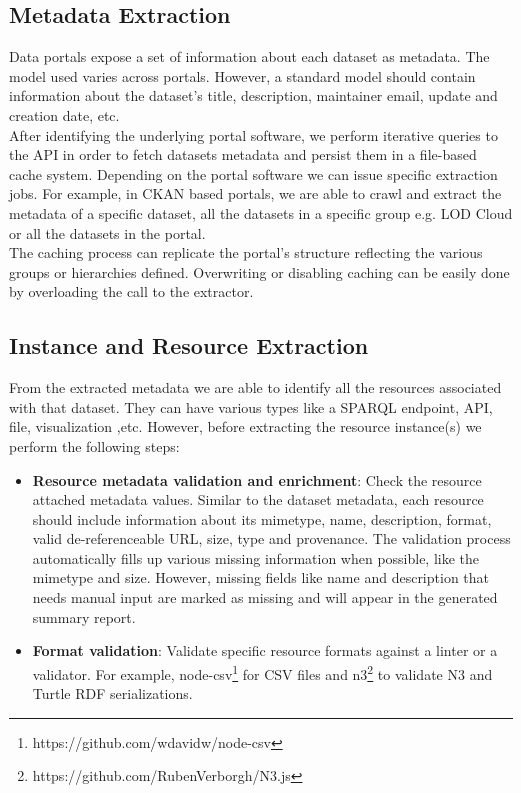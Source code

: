 \documentclass[runningheads,a4paper]{llncs}
\begin{document}
\subsection{Metadata Extraction}

Data portals expose a set of information about each dataset as metadata. The model used varies across portals. However, a standard model should contain information about the dataset's title, description, maintainer email, update and creation date, etc.\\
After identifying the underlying portal software, we perform iterative queries to the API in order to fetch datasets metadata and persist them in a file-based cache system. Depending on the portal software we can issue specific extraction jobs. For example, in CKAN based portals, we are able to crawl and extract the metadata of a specific dataset, all the datasets in a specific group e.g. LOD Cloud or all the datasets in the portal.\\The caching process can replicate the portal's structure reflecting the various groups or hierarchies defined. Overwriting or disabling caching can be easily done by overloading the call to the extractor.

\subsection{Instance and Resource Extraction}

From the extracted metadata we are able to identify all the resources associated with that dataset. They can have various types like a SPARQL endpoint, API, file, visualization ,etc. However, before extracting the resource instance(s) we perform the following steps:

\begin{itemize}
  \item \textbf{Resource metadata validation and enrichment}: Check the resource attached metadata values. Similar to the dataset metadata, each resource should include information about its mimetype, name, description, format, valid de-referenceable URL, size, type and provenance. The validation process automatically fills up various missing information when possible, like the mimetype and size. However, missing fields like name and description that needs manual input are marked as missing and will appear in the generated summary report.
  \item \textbf{Format validation}: Validate specific resource formats against a linter or a validator. For example, node-csv\footnote{https://github.com/wdavidw/node-csv} for CSV files and n3\footnote{https://github.com/RubenVerborgh/N3.js} to validate N3 and Turtle RDF serializations.
\end{itemize}
\end{document}
